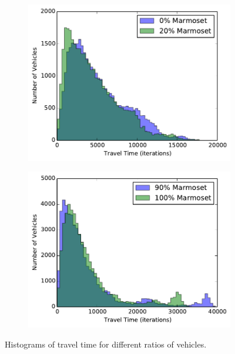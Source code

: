 \documentclass[ %
                    author={Alexander Hill},
                supervisor={Dr. Benjamin Sach},
                    degree={MEng},
                     title={MARMOSET},
                  subtitle={Multi-Agent Route Management using Online Simulation for Efficient Transportation},
                      type={research},
                      year={2016} ]{dissertation}
\begin{document}
\begin{figure}[h]
    \centering
    \begin{subfigure}[b]{0.45\textwidth}
        \centering
        \includegraphics[width=\textwidth]{0-20-hist}
        \caption{}\label{fig:0-20-hist}
    \end{subfigure}
    \hfill
    \begin{subfigure}[b]{0.45\textwidth}
        \centering
        \includegraphics[width=\textwidth]{90-100-hist}
        \caption{}\label{fig:90-100-hist}
    \end{subfigure}
    \caption{Histograms of travel time for different ratios of vehicles.}\label{fig:ratio-hists}
\end{figure}
\end{document}
